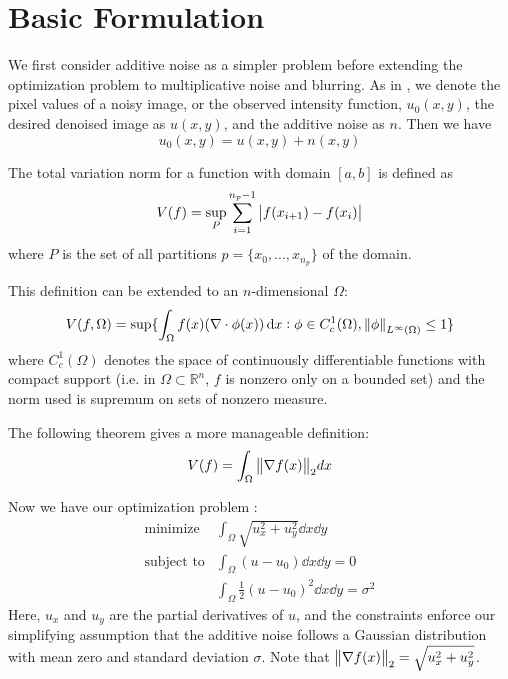 \documentclass[11pt, oneside]{article}   	%
\begin{document}
\section{Basic Formulation}

We first consider additive noise as a simpler problem before extending the
optimization problem to multiplicative noise and blurring. As in \cite{rudin1992}, we
denote the pixel values of a noisy image, or the observed intensity function,
$u_0(x,y)$, the desired denoised image as $u(x,y)$, and the additive noise as
$n$. Then we have
\begin{equation}
  u_0(x,y) = u(x,y) + n(x,y)
\end{equation}

The total variation norm for a function with domain $[a,b]$ is defined as
\begin{equation}
  V(f) = \sup_P \sum_{i=1}^{n_p - 1} \abs{f(x_{i+1}) - f(x_i)}
\end{equation}
where $P$ is the set of all partitions $p = \{x_0,...,x_{n_p}\}$ of the domain.

This definition can be extended to an $n$-dimensional $\Omega$:
\begin{equation}
  V(f, \Omega) = \sup \{\int_{\Omega}f(x) (\nabla \cdot \phi (x)) \dd{x} : \phi \in C_c^1(\Omega), \norm{\phi}_{L^\infty(\Omega)} \leq 1 \}
\end{equation}
where $C_c^1(\Omega)$ denotes the space of continuously differentiable functions
with compact support (i.e. in $\Omega \subset \mathbb{R}^n$, $f$ is nonzero only
on a bounded set) and the norm used is supremum on sets of nonzero measure.

The following theorem gives a more manageable definition:
\begin{equation}
  V(f) = \int_{\Omega} \norm{\nabla f(x)}_2 dx
\end{equation}

Now we have our optimization problem \cite{rudin1992}:
\begin{align}
  \text{minimize} &\int_\Omega \sqrt{u_x^2 + u_y^2} \dd{x} \dd{y} \\
  \text{subject to} &\int_\Omega (u - u_0) \dd{x} \dd{y} = 0 \\
                    &\int_\Omega \frac{1}{2} (u - u_0)^2 \dd{x} \dd{y} = \sigma^2
\end{align}
Here, $u_x$ and $u_y$ are the partial derivatives of $u$, and the constraints
enforce our simplifying assumption that the additive noise follows a Gaussian
distribution with mean zero and standard deviation $\sigma$. Note that
$\norm{\nabla f(x)}_2 = \sqrt{u_x^2 + u_y^2}$.
\end{document}
